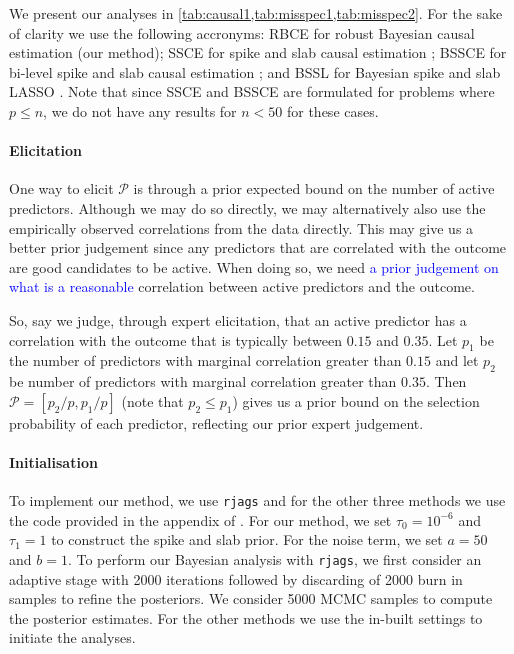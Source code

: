 \documentclass[preprint,12pt]{elsarticle}
\newcommand{\added}[1]{\textcolor{blue}{#1}}
\begin{document}
We present our analyses in \cref{tab:causal1,tab:misspec1,tab:misspec2}.
For the sake of clarity we use the following accronyms: RBCE for 
robust Bayesian causal estimation (our method); SSCE for spike and
slab causal estimation \citep{koch2020}; BSSCE for bi-level spike and slab causal
estimation \citep{koch2020}; and BSSL for Bayesian spike and slab LASSO
\citep{xu2015}. Note that since SSCE and BSSCE are formulated for problems
where $p\le n$, we do not have any results for $n<50$ for these cases.

\paragraph{Elicitation}
One way to elicit $\mathcal{P}$
is through a prior expected bound on the number of active predictors.
Although we may do so directly,
we may alternatively also use the empirically observed correlations from the data directly.
This may give us a better prior judgement since any predictors that are correlated with the outcome are good candidates to be active.
When doing so, we need \added{a prior judgement on what is a reasonable} correlation between active predictors and the outcome.

So, say we judge, through expert elicitation, that
an active predictor has a correlation with the outcome
that is typically between $0.15$ and $0.35$.
Let $p_1$ be the number of predictors with marginal correlation greater than $0.15$
and let $p_2$ be number of predictors with marginal 
correlation greater than $0.35$.
Then $\mathcal{P}=[p_2/p , p_1/p]$ (note that $p_2\le p_1$) gives us a prior bound on the selection probability of each predictor, reflecting our prior expert judgement.

\paragraph{Initialisation} 
To implement our method, we use \texttt{rjags} and for the other three
methods we use the code provided in the appendix of \citep{koch2020}.
For our method, we set $\tau_0=10^{-6}$ and $\tau_1=1$ to construct the
spike and slab prior.
For the noise term, we set $a=50$ and $b=1$.
To perform 
our Bayesian analysis with \texttt{rjags}, we first consider an adaptive 
stage with 2000 iterations followed by discarding of 2000 burn in samples 
to refine the posteriors. We consider 5000 MCMC samples to compute the
posterior estimates. For the other methods we use the in-built settings 
to initiate the analyses.
\end{document}
